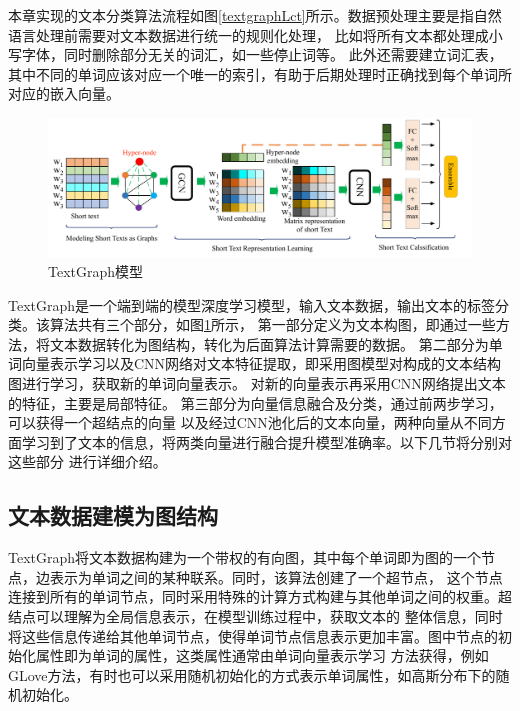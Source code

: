 本章实现的文本分类算法流程如图\ref{textgraphLct}所示。数据预处理主要是指自然语言处理前需要对文本数据进行统一的规则化处理，
比如将所有文本都处理成小写字体，同时删除部分无关的词汇，如一些停止词等。
此外还需要建立词汇表，其中不同的单词应该对应一个唯一的索引，有助于后期处理时正确找到每个单词所对应的嵌入向量。
\begin{figure}[htb]%
	\setlength{\belowcaptionskip}{0pt}
	\centering
	\includegraphics[width=1\textwidth]{pic/TextGraph-arch.pdf}
	\caption{TextGraph模型}
	\label{TextGraph}
\end{figure}

TextGraph是一个端到端的模型深度学习模型，输入文本数据，输出文本的标签分类。该算法共有三个部分，如图\ref{TextGraph}所示，
第一部分定义为文本构图，即通过一些方法，将文本数据转化为图结构，转化为后面算法计算需要的数据。
第二部分为单词向量表示学习以及CNN网络对文本特征提取，即采用图模型对构成的文本结构图进行学习，获取新的单词向量表示。
对新的向量表示再采用CNN网络提出文本的特征，主要是局部特征。
第三部分为向量信息融合及分类，通过前两步学习，可以获得一个超结点的向量
以及经过CNN池化后的文本向量，两种向量从不同方面学习到了文本的信息，将两类向量进行融合提升模型准确率。以下几节将分别对这些部分
进行详细介绍。
\subsection{文本数据建模为图结构}
TextGraph将文本数据构建为一个带权的有向图，其中每个单词即为图的一个节点，边表示为单词之间的某种联系。同时，该算法创建了一个超节点，
这个节点连接到所有的单词节点，同时采用特殊的计算方式构建与其他单词之间的权重。超结点可以理解为全局信息表示，在模型训练过程中，获取文本的
整体信息，同时将这些信息传递给其他单词节点，使得单词节点信息表示更加丰富。图中节点的初始化属性即为单词的属性，这类属性通常由单词向量表示学习
方法获得，例如GLove方法，有时也可以采用随机初始化的方式表示单词属性，如高斯分布下的随机初始化。


